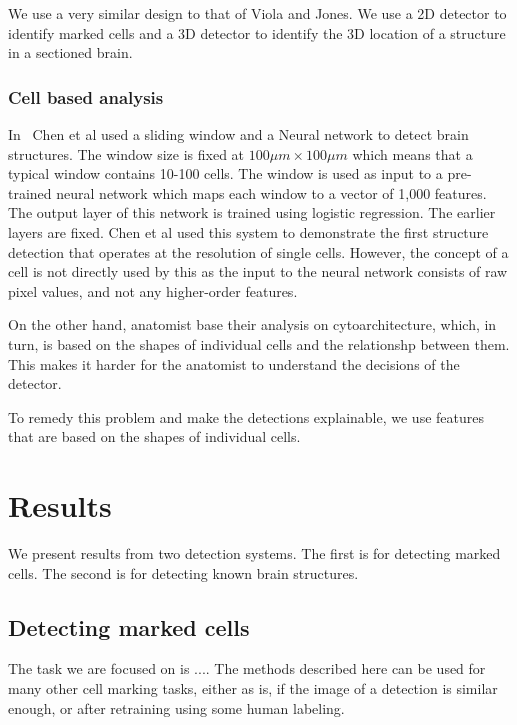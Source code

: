 \documentclass[11pt]{article}
\begin{document}
We use a very similar design to that of Viola and Jones. We use a 2D
detector to identify marked cells and a 3D detector to identify the 3D
location of a structure in a sectioned brain.

\subsubsection{Cell based analysis}

In~\cite{chen2019active} Chen et al used a sliding window and a
Neural network to detect brain structures. The window size is fixed at
$100 \mu m \times 100 \mu m$ which means that a typical window contains 10-100 cells.
The window is used as input to a pre-trained neural network which maps
each window to a vector of 1,000 features. The output layer of
this network is trained using logistic regression. The earlier layers
are fixed. Chen et al used this system to demonstrate the first
structure detection that operates at the resolution of single cells.
However, the concept of a cell is not directly used by this as the
input to the neural network consists of raw pixel values, and not any
higher-order features.

On the other hand, anatomist base their analysis on cytoarchitecture,
which, in turn, is based on the shapes of individual cells and the
relationshp between them. This makes it harder for the anatomist to
understand the decisions of the detector.

To remedy this problem and make the detections explainable, we use
features that are based on the shapes of individual cells.

\section{Results}

We present results from two detection systems. The first is for
detecting marked cells. The second is for detecting known
brain structures. 

\subsection{Detecting marked cells}
The task we are focused on is ....
The methods described here can be used for many other cell marking
tasks, either as is, if the image of a detection is similar enough, or
after retraining using some human labeling.


\end{document}
